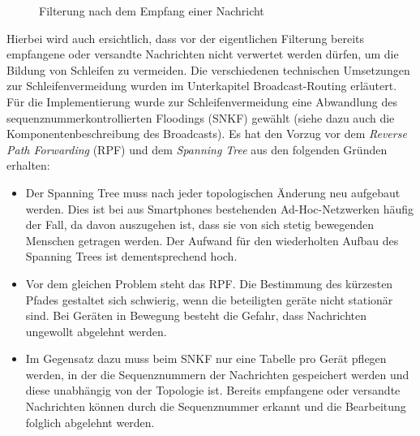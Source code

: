 \begin{figure}[H]
	\centering
	\hspace*{1cm}
	\caption{Filterung nach dem Empfang einer Nachricht}
	\label{fig:empfangNachricht}
\end{figure}
Hierbei wird auch ersichtlich, dass vor der eigentlichen Filterung bereits empfangene oder versandte Nachrichten nicht verwertet werden dürfen, um die Bildung von Schleifen zu vermeiden. Die verschiedenen technischen Umsetzungen zur Schleifenvermeidung wurden im Unterkapitel Broadcast-Routing erläutert. 
\\Für die Implementierung wurde zur Schleifenvermeidung eine Abwandlung des sequenznummerkontrollierten Floodings (SNKF) gewählt (siehe dazu auch die Komponentenbeschreibung des Broadcasts). Es hat den Vorzug vor dem \textit{Reverse Path Forwarding} (RPF) und dem \textit{Spanning Tree} aus den folgenden Gründen erhalten:
\begin{itemize}
	\item Der Spanning Tree muss nach jeder topologischen Änderung neu aufgebaut werden. Dies ist bei aus Smartphones bestehenden Ad-Hoc-Netzwerken häufig der Fall, da davon auszugehen ist, dass sie von sich stetig bewegenden Menschen getragen werden. Der Aufwand für den wiederholten Aufbau des Spanning Trees ist dementsprechend hoch.
	\item Vor dem gleichen Problem steht das RPF. Die Bestimmung des kürzesten Pfades gestaltet sich schwierig, wenn die beteiligten geräte nicht stationär sind. Bei Geräten in Bewegung besteht die Gefahr, dass Nachrichten ungewollt abgelehnt werden.
	\item Im Gegensatz dazu muss beim SNKF nur eine Tabelle pro Gerät pflegen werden, in der die Sequenznummern der Nachrichten gespeichert werden und diese unabhängig von der Topologie ist. Bereits empfangene oder versandte Nachrichten können durch die Sequenznummer erkannt und die Bearbeitung folglich abgelehnt werden.
\end{itemize}
